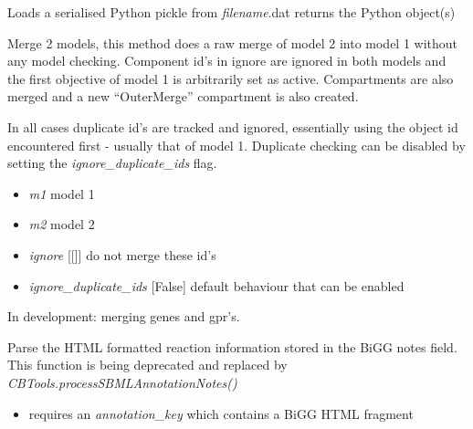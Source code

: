 \documentclass[a4paper,11pt,english]{sphinxmanual}
\begin{document}

\begin{fulllineitems}
\label{modules_doc:cbmpy.CBTools.loadObj}
Loads a serialised Python pickle from \emph{filename}.dat returns the Python object(s)

\end{fulllineitems}


\begin{fulllineitems}
\label{modules_doc:cbmpy.CBTools.merge2Models}
Merge 2 models, this method does a raw merge of model 2 into model 1 without any model checking.
Component id's in ignore are ignored in both models and the first objective of model 1 is arbitrarily
set as active. Compartments are also merged and a new ``OuterMerge'' compartment is also created.

In all cases duplicate id's are tracked and ignored, essentially using the object id encountered first -
usually that of model 1. Duplicate checking can be disabled by setting the \emph{ignore\_duplicate\_ids} flag.
\begin{itemize}
\item {} 
\emph{m1} model 1

\item {} 
\emph{m2} model 2

\item {} 
\emph{ignore} {[}{[}{]}{]} do not merge these id's

\item {} 
\emph{ignore\_duplicate\_ids} {[}False{]} default behaviour that can be enabled

\end{itemize}

In development: merging genes and gpr's.

\end{fulllineitems}


\begin{fulllineitems}
\label{modules_doc:cbmpy.CBTools.processBiGGannotationNote}
Parse the HTML formatted reaction information stored in the BiGG notes field.
This function is being deprecated and replaced by \emph{CBTools.processSBMLAnnotationNotes()}
\begin{itemize}
\item {} 
requires an \emph{annotation\_key} which contains a BiGG HTML fragment

\end{itemize}

\end{fulllineitems}
\end{document}
